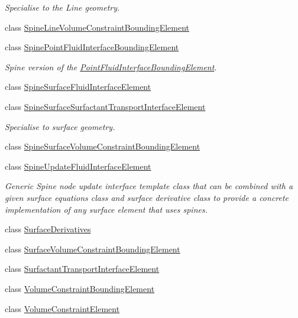 \begin{DoxyCompactItemize}
\begin{DoxyCompactList}\small\item\em Specialise to the Line geometry. \end{DoxyCompactList}\item 
class \hyperlink{classoomph_1_1SpineLineVolumeConstraintBoundingElement}{Spine\+Line\+Volume\+Constraint\+Bounding\+Element}
\item 
class \hyperlink{classoomph_1_1SpinePointFluidInterfaceBoundingElement}{Spine\+Point\+Fluid\+Interface\+Bounding\+Element}
\begin{DoxyCompactList}\small\item\em Spine version of the \hyperlink{classoomph_1_1PointFluidInterfaceBoundingElement}{Point\+Fluid\+Interface\+Bounding\+Element}. \end{DoxyCompactList}\item 
class \hyperlink{classoomph_1_1SpineSurfaceFluidInterfaceElement}{Spine\+Surface\+Fluid\+Interface\+Element}
\item 
class \hyperlink{classoomph_1_1SpineSurfaceSurfactantTransportInterfaceElement}{Spine\+Surface\+Surfactant\+Transport\+Interface\+Element}
\begin{DoxyCompactList}\small\item\em Specialise to surface geometry. \end{DoxyCompactList}\item 
class \hyperlink{classoomph_1_1SpineSurfaceVolumeConstraintBoundingElement}{Spine\+Surface\+Volume\+Constraint\+Bounding\+Element}
\item 
class \hyperlink{classoomph_1_1SpineUpdateFluidInterfaceElement}{Spine\+Update\+Fluid\+Interface\+Element}
\begin{DoxyCompactList}\small\item\em Generic Spine node update interface template class that can be combined with a given surface equations class and surface derivative class to provide a concrete implementation of any surface element that uses spines. \end{DoxyCompactList}\item 
class \hyperlink{classoomph_1_1SurfaceDerivatives}{Surface\+Derivatives}
\item 
class \hyperlink{classoomph_1_1SurfaceVolumeConstraintBoundingElement}{Surface\+Volume\+Constraint\+Bounding\+Element}
\item 
class \hyperlink{classoomph_1_1SurfactantTransportInterfaceElement}{Surfactant\+Transport\+Interface\+Element}
\item 
class \hyperlink{classoomph_1_1VolumeConstraintBoundingElement}{Volume\+Constraint\+Bounding\+Element}
\item 
class \hyperlink{classoomph_1_1VolumeConstraintElement}{Volume\+Constraint\+Element}
\end{DoxyCompactItemize}
